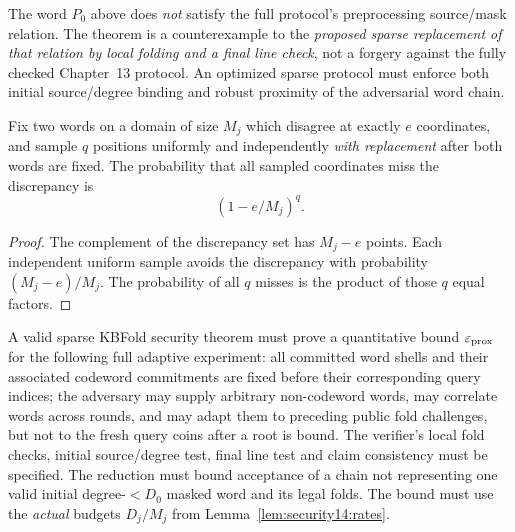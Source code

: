 \begin{remark}
The word $P_0$ above does
\emph{not} satisfy the
full protocol's preprocessing
source/mask relation.
The theorem is a
counterexample to the
\emph{proposed sparse
replacement of that relation
by local folding and a
final line check}, not a
forgery against the fully
checked Chapter~13 protocol.
An optimized sparse protocol
must enforce both
initial source/degree binding
and robust proximity of
the adversarial word chain.
\end{remark}

\begin{lemma}\label{lem:security14:query-detection}
Fix two words on a domain of
size $M_j$ which disagree
at exactly $e$ coordinates,
and sample $q$ positions
uniformly and independently
\emph{with replacement}
after both words are fixed.
The probability that all
sampled coordinates miss
the discrepancy is
\[
 \boxed{(1-e/M_j)^q.}
\]
\end{lemma}
\begin{proof}
The complement of the
discrepancy set has
$M_j-e$ points.
Each independent uniform
sample avoids the
discrepancy with probability
$(M_j-e)/M_j$.
The probability of all
$q$ misses is the
product of those
$q$ equal factors.
\end{proof}

\begin{definition}\label{def:security14:proximity-contract}
A valid sparse KBFold security
theorem must prove a quantitative
bound $\varepsilon_{\rm prox}$
for the following full
adaptive experiment:
all committed word shells and
their associated codeword
commitments are fixed before
their corresponding query
indices; the adversary may
supply arbitrary non-codeword
words, may correlate words
across rounds, and may adapt
them to preceding public fold
challenges, but not to the
fresh query coins after a
root is bound.
The verifier's local fold
checks, initial source/degree
test, final line test and
claim consistency must be
specified. The reduction
must bound acceptance of
a chain not representing
one valid initial
degree-$<D_0$ masked word
and its legal folds.
The bound must use the
\emph{actual} budgets
$D_j/M_j$ from
Lemma~\ref{lem:security14:rates}.
\end{definition}

